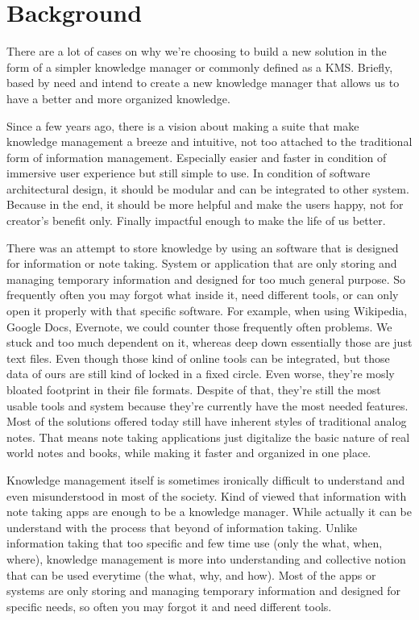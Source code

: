 \section{Background}
\label{sec:background}

There are a lot of cases on why we're choosing to build a new solution in the form of a simpler knowledge manager or commonly defined as a \ac{KMS}.
Briefly, based by need and intend to create a new knowledge manager that allows us to have a better and more organized knowledge.

Since a few years ago, there is a vision about making a suite that make knowledge management a breeze and intuitive, not too attached to the traditional form of information management.
Especially easier and faster in condition of immersive user experience but still simple to use.
In condition of software architectural design, it should be modular and can be integrated to other system.
Because in the end, it should be more helpful and make the users happy, not for creator's benefit only.
Finally impactful enough to make the life of us better.

There was an attempt to store knowledge by using an software that is designed for information or note taking. System or application that are only storing and managing temporary information and designed for too much general purpose.
So frequently often you may forgot what inside it, need different tools, or can only open it properly with that specific software.
For example, when using Wikipedia, Google Docs, Evernote, we could counter those frequently often problems.
We stuck and too much dependent on it, whereas deep down essentially those are just text files.
Even though those kind of online tools can be integrated, but those data of ours are still kind of locked in a fixed circle.
Even worse, they're mosly bloated footprint in their file formats.
Despite of that, they're still the most usable tools and system because they're currently have the most needed features.
Most of the solutions offered today still have inherent styles of traditional analog notes.
That means note taking applications just digitalize the basic nature of real world notes and books, while making it faster and organized in one place.

Knowledge management itself is sometimes ironically difficult to understand and even misunderstood in most of the society.
Kind of viewed that information with note taking apps are enough to be a knowledge manager.
While actually it can be understand with the process that beyond of information taking.
Unlike information taking that too specific and few time use (only the what, when, where), knowledge management is more into understanding and collective notion that can be used everytime (the what, why, and how).
Most of the apps or systems are only storing and managing temporary information and designed for specific needs, so often you may forgot it and need different tools.

